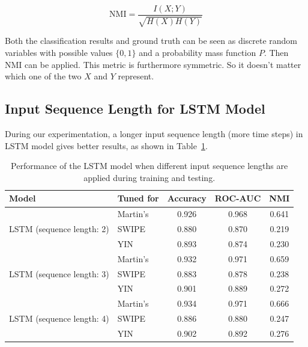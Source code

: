\documentclass[11pt,a4paper,titlepage]{article}
\begin{document}
\begin{equation*}
  \mathrm{NMI} = \frac{I(X;Y)}{\sqrt{H(X)H(Y)}}
\end{equation*}

Both the classification results and ground truth can be seen as discrete random variables with possible values \(\lbrace 0,1 \rbrace\) and a probability mass function \(P\).
Then NMI can be applied.
This metric is furthermore symmetric.
So it doesn't matter which one of the two \(X\) and \(Y\) represent.

\newpage

\subsection{Input Sequence Length for LSTM Model}

During our experimentation, a longer input sequence length (more time steps) in LSTM model gives better results, as shown in Table~\ref{tab:lstm-isl}.

\begin{table}[htbp]
  \centering
  \begin{tabular}{llccc}
  	\toprule
  	Model                                      & Tuned for & Accuracy & ROC-AUC &  NMI  \\
  	\midrule
  	\multirow{3}{*}{LSTM (sequence length: 2)} & Martin's  &  0.926   &  0.968  & 0.641 \\
  	                                           & SWIPE     &  0.880   &  0.870  & 0.219 \\
  	                                           & YIN       &  0.893   &  0.874  & 0.230 \\
  	\midrule
  	\multirow{3}{*}{LSTM (sequence length: 3)} & Martin's  &  0.932   &  0.971  & 0.659 \\
  	                                           & SWIPE     &  0.883   &  0.878  & 0.238 \\
  	                                           & YIN       &  0.901   &  0.889  & 0.272 \\
  	\midrule
  	\multirow{3}{*}{LSTM (sequence length: 4)} & Martin's  &  0.934   &  0.971  & 0.666 \\
  	                                           & SWIPE     &  0.886   &  0.880  & 0.247 \\
  	                                           & YIN       &  0.902   &  0.892  & 0.276 \\
  	\bottomrule
  \end{tabular}
  \caption{Performance of the LSTM model when different input sequence lengths are applied during training and testing.} \label{tab:lstm-isl}
\end{table}
\end{document}
